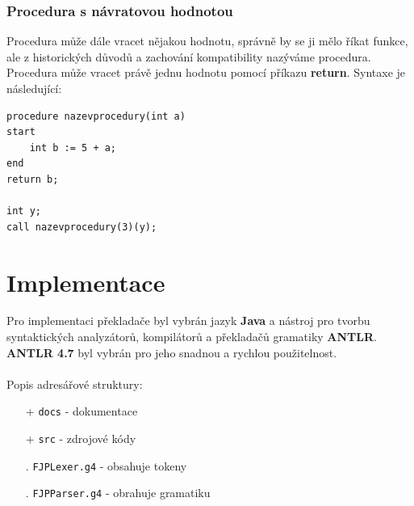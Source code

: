 \documentclass[12pt]{report}
\begin{document}
\subsection{Procedura s návratovou hodnotou}
Procedura může dále vracet nějakou hodnotu, správně by se ji mělo říkat funkce, ale z historických důvodů a zachování kompatibility nazýváme procedura.  Procedura může vracet právě jednu hodnotu pomocí příkazu \textbf{return}. Syntaxe je následující:
\begin{verbatim}
procedure nazevprocedury(int a)
start
    int b := 5 + a;
end
return b;

int y;
call nazevprocedury(3)(y);
\end{verbatim}




\chapter{Implementace}
Pro implementaci překladače byl vybrán jazyk \textbf{Java} a nástroj pro tvorbu syntaktických analyzátorů, kompilátorů a překladačů gramatiky \textbf{ANTLR}. \textbf{ANTLR 4.7} byl vybrán pro jeho snadnou a rychlou použitelnost.
\\\\
Popis adresářové struktury:
\begin{itemize}[noitemsep]
\item [+] \texttt{docs} - dokumentace
\item [+] \texttt{src} - zdrojové kódy
\item [.] \texttt{FJPLexer.g4} - obsahuje tokeny
\item [.] \texttt{FJPParser.g4} - obrahuje gramatiku
\end{itemize}
\end{document}
